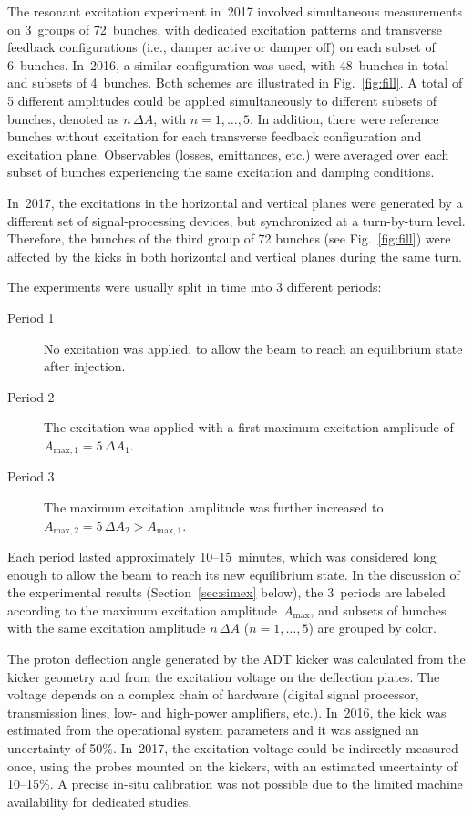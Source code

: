 \documentclass[%
 reprint,
 amsmath,amssymb,
 aps,
prstab,
longbibliography
]{revtex4-1}
\begin{document}
The resonant excitation experiment in~2017 involved simultaneous
measurements on 3~groups of 72~bunches, with dedicated excitation
patterns and transverse feedback configurations (i.e., damper active
or damper off) on each subset of 6~bunches. In~2016, a similar
configuration was used, with 48~bunches in total and subsets of
4~bunches. Both schemes are illustrated in Fig.~\ref{fig:fill}. A
total of 5 different amplitudes could be applied simultaneously to
different subsets of bunches, denoted as $n \, \Delta A$, with
$n = 1, \ldots, 5$. In addition, there were reference bunches without
excitation for each transverse feedback configuration and excitation
plane. Observables (losses, emittances, etc.) were averaged over each
subset of bunches experiencing the same excitation and damping
conditions.

In~2017, the excitations in the horizontal and vertical planes were
generated by a different set of signal-processing devices, but
synchronized at a turn-by-turn level. Therefore, the bunches of the
third group of 72 bunches (see Fig.~\ref{fig:fill}) were affected by
the kicks in both horizontal and vertical planes during the same turn.

The experiments were usually split in time into 3 different periods:
%
\begin{description}
\item[Period 1] No excitation was applied, to allow the beam to reach
  an equilibrium state after injection.
\item[Period 2] The excitation was applied with a first maximum
  excitation amplitude of $A_{\mathrm{max,1}} = 5 \, \Delta A_1$.
\item[Period 3] The maximum excitation amplitude was further increased
  to $A_{\mathrm{max,2}} = 5 \, \Delta A_2 > A_{\mathrm{max,1}}$.
\end{description}
%
Each period lasted approximately 10--15~minutes, which was considered
long enough to allow the beam to reach its new equilibrium state. In
the discussion of the experimental results (Section~\ref{sec:simex}
below), the 3~periods are labeled according to the maximum excitation
amplitude~$A_\mathrm{max}$, and subsets of bunches with the same
excitation amplitude $n \, \Delta A$ ($n = 1, \ldots, 5$) are grouped
by color.

The proton deflection angle generated by the ADT kicker was calculated
from the kicker geometry and from the excitation voltage on the
deflection plates. The voltage depends on a complex chain of hardware
(digital signal processor, transmission lines, low- and high-power
amplifiers, etc.). In~2016, the kick was estimated from the
operational system parameters and it was assigned an uncertainty of
50\%. In~2017, the excitation voltage could be indirectly measured
once, using the probes mounted on the kickers, with an estimated
uncertainty of 10--15\%. A precise in-situ calibration was not
possible due to the limited machine availability for dedicated
studies.
\end{document}
